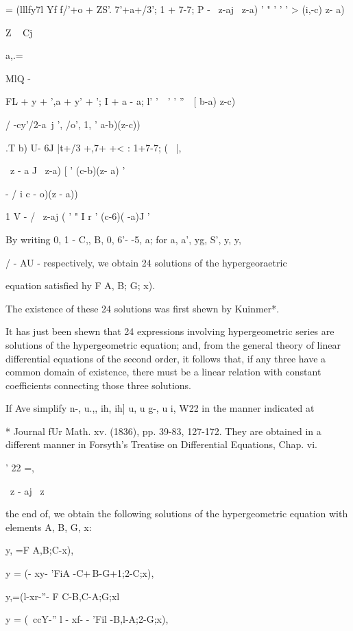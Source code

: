    = (lllfy7l Yf f/'+o + ZS'. 7'+a+/3'; 1 + 7-7; P - \ z-aj \ z-a) ' "
' ' ' > (i,-c) z- a)

%
%

Z ~ Cj

a,.=

MlQ -

FL + y + ',a + y' + '; I + a - a; l' '\ \ ' ' ''\ \, [ b-a) z-c)

/ -cy'/2-a\ j ', /o', 1, ' a-b)(z-c))

.T b) U- 6J |t+/3 +,7+ +< : 1+7-7; \;( \ |,

\ z - a J \ z-a) [ ' (c-b)(z- a) '

- / i c - o)(z - a))

1 V - / \ z-aj ( ' " I r ' (c-6)( -a)J '

By writing 0, 1 - C,, B, 0, 6'- -5, a; for a, a', yg, S', y, y,

/ - AU - respectively, we obtain 24 solutions of the hypergeoraetric

equation satisfied hy F A, B; G; x).

The existence of these 24 solutions was first shewn by Kuinmer*.


It has just been shewn that 24 expressions involving hypergeometric
series are solutions of the hypergeometric equation; and, from the
general theory of linear differential equations of the second order,
it follows that, if any three have a common domain of existence, there
must be a linear relation with constant coefficients connecting those
three solutions.

If Ave simplify n-, u.,, ih, ih] u, u g-, u i, W22 in the manner
indicated at

* Journal fUr Math. xv. (1836), pp. 39-83, 127-172. They are obtained
in a different manner in Forsyth's Treatise on Differential Equations,
Chap. vi.

' 22 =,

\ z - aj \ z

%
%

the end of, we obtain the following solutions of the
hypergeometric equation with elements A, B, G, x:

y, =F A,B;C-x),

y = (- xy- 'FiA -C+\,B-G+1;2-C;x),

y,=(l-xr-''- F C-B,C-A;G;xl

y = (\ ccY-'' l - xf- - 'Fil -B,l-A;2-G;x),


